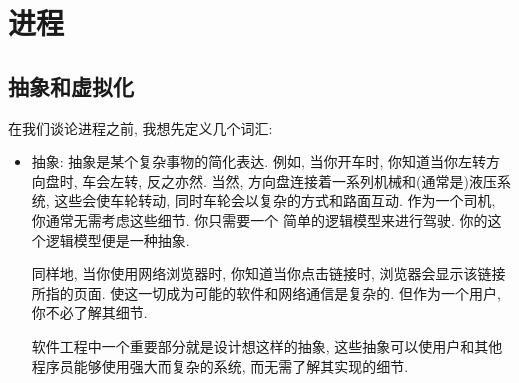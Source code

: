 \documentclass[12pt]{book}
\begin{document}
{%

%
\chapter{进程}

\section{抽象和虚拟化}
在我们谈论进程之前, 我想先定义几个词汇:

\begin{itemize}

\item 抽象: 抽象是某个复杂事物的简化表达.
例如, 当你开车时, 你知道当你左转方向盘时, 车会左转,
反之亦然. 当然, 方向盘连接着一系列机械和(通常是)液压系统, 
这些会使车轮转动, 同时车轮会以复杂的方式和路面互动.
作为一个司机, 你通常无需考虑这些细节. 你只需要一个
简单的逻辑模型来进行驾驶. 你的这个逻辑模型便是一种抽象.


同样地, 当你使用网络浏览器时, 你知道当你点击链接时,
浏览器会显示该链接所指的页面.
使这一切成为可能的软件和网络通信是复杂的.
但作为一个用户, 你不必了解其细节.

软件工程中一个重要部分就是设计想这样的抽象,
这些抽象可以使用户和其他程序员能够使用强大而复杂的系统,
而无需了解其实现的细节.


\end{itemize}}
\end{document}
